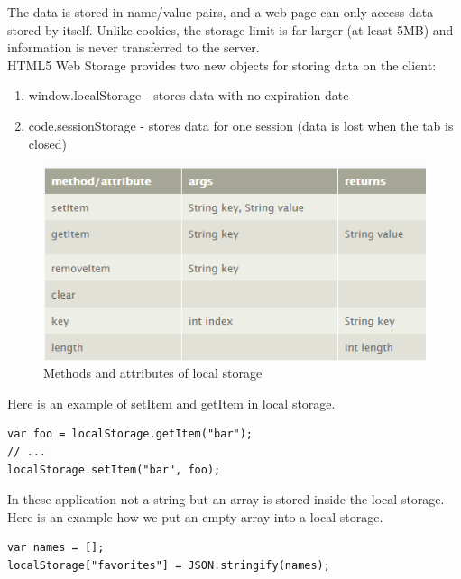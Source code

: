 The data is stored in name/value pairs, and a web page can only access data stored by itself. Unlike cookies, the storage limit is far larger (at least 5MB) and information is never transferred to the server.\cite{w3school}
\\

HTML5 Web Storage provides two new objects for storing data on the client:
\begin{enumerate}
\item window.localStorage - stores data with no expiration date\cite{w3school}
\item code.sessionStorage - stores data for one session (data is lost when the tab is closed)\cite{w3school}
\end{enumerate}


\begin{figure}[h]
\centering
\includegraphics[width=0.9\linewidth]{graphics/chapter4/20}
\caption{Methods and attributes of local storage\cite{localstorageapi}}
\label{fig:4}
\end{figure}


Here is an example of setItem and getItem in local storage.
\\

\begin{lstlisting}[language=html, caption= 
setItem example (Adapted from \cite{localstorageexample}),captionpos=b]
var foo = localStorage.getItem("bar");
// ...
localStorage.setItem("bar", foo);
\end{lstlisting}

In these application not a string but an array is stored inside the local storage. Here is an example how we put an empty array into a local storage.
\\

\begin{lstlisting}[language=html, caption= 
array into local storage,captionpos=b]
var names = [];
localStorage["favorites"] = JSON.stringify(names);
\end{lstlisting}


